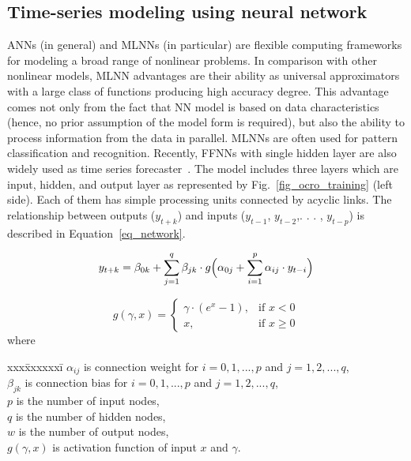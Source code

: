 \documentclass[smallcondensed, natbib]{svjour3}     %
\begin{document}
\subsection{Time-series modeling using neural network}
\label{mlnn_model}

ANNs (in general) and MLNNs (in particular) are flexible computing frameworks for modeling a broad range of nonlinear problems. In comparison with other nonlinear models, MLNN advantages are their ability as universal approximators with a large class of functions producing high accuracy degree. This advantage comes not only from the fact that NN model is based on data characteristics (hence, no prior assumption of the model form is required), but also the ability to process information from the data in parallel. MLNNs are often used for pattern classification and recognition. Recently, FFNNs with single hidden layer are also widely used as time series forecaster~\citep{ref_zhang2}. The model includes three layers which are input, hidden, and output layer as represented by Fig.~\ref{fig_ocro_training} (left side). Each of them has simple processing units connected by acyclic links. The relationship between outputs ($y_{t+k}$) and inputs ($y_{t-1}$, $y_{t-2}$,. . . , $y_{t-p}$) is described in Equation~\ref{eq_network}.

\begin{equation} \label{eq_network}
	y_{t+k} = \beta_{0k} + \sum_{j=1}^q \beta_{jk} \cdot g \Bigl( \alpha_{0j} + \sum_{i=1}^p \alpha_{ij} \cdot y_{t-i} \Bigr) 
\end{equation}

\begin{equation} \label{eq_activation}
	g(\gamma, x) = \begin{cases}  \gamma \cdot (e^x - 1) , & \mbox{if } x < 0\\ x, & \mbox{if } x \geq 0 \end{cases}
\end{equation}
where 	
\begin{tabbing}
	xxx\=xxxxxxi\=\kill
	\>	$\alpha_{ij}$	\> is connection weight for	$i = 0, 1,..., p$ and $j = 1, 2,..., q$,	\\
	\>	$\beta_{jk}$	\> is connection bias for $i = 0, 1,..., p$ and $j = 1, 2,..., q$,	\\
	\>	$p$ 			\>	is the number of input nodes,		\\
	\>	$q$ 			\>	is the number of hidden nodes,	\\
	\>	$w$ 			\>	is the number of output nodes, 	\\
	\>	$g(\gamma, x)$ 	\>	is activation function of input $x$ and $\gamma$. 			
\end{tabbing}
\end{document}
